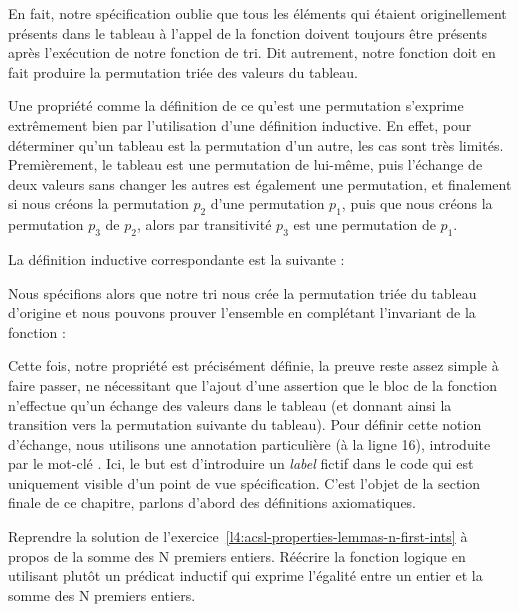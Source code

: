 En fait, notre spécification oublie que tous les éléments qui étaient
originellement présents dans le tableau à l'appel de la fonction doivent
toujours être présents après l'exécution de notre fonction de tri. Dit
autrement, notre fonction doit en fait produire la permutation triée des
valeurs du tableau.



Une propriété comme la définition de ce qu'est une permutation s'exprime
extrêmement bien par l'utilisation d'une définition inductive. En effet, pour
déterminer qu'un tableau est la permutation d'un autre, les cas sont très limités.
Premièrement, le tableau est une permutation de lui-même, puis l'échange de
deux valeurs sans changer les autres est également une permutation, et
finalement si nous créons la permutation $p_2$ d'une permutation $p_1$, puis que
nous créons la permutation $p_3$ de $p_2$, alors par transitivité $p_3$ est une
permutation de $p_1$.



La définition inductive correspondante est la suivante :






Nous spécifions alors que notre tri nous crée la permutation triée du tableau
d'origine et nous pouvons prouver l'ensemble en complétant l'invariant de la
fonction :





Cette fois, notre propriété est précisément définie, la preuve reste assez
simple à faire passer, ne nécessitant que l'ajout d'une assertion que le bloc
de la fonction n'effectue qu'un échange des valeurs dans le tableau (et donnant
ainsi la transition vers la permutation suivante du tableau). Pour définir cette
notion d'échange, nous utilisons une annotation particulière (à la ligne 16),
introduite par le mot-clé . Ici, le but est d'introduire un \textit{label}
fictif dans le code qui est uniquement visible d'un point de vue spécification.
C'est l'objet de la section finale de ce chapitre, parlons d'abord des définitions
axiomatiques.








Reprendre la solution de l'exercice~\ref{l4:acsl-properties-lemmas-n-first-ints} à
propos de la somme des N premiers entiers. Réécrire la fonction logique en utilisant
plutôt un prédicat inductif qui exprime l'égalité entre un entier et la somme des
N premiers entiers.



